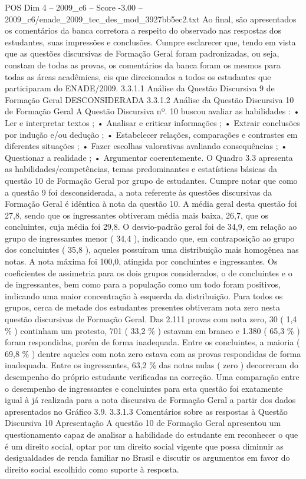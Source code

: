 \begin{textsample}{POS Dim 4 – 2009\_c6 – Score -3.00 – 2009\_c6/enade\_2009\_tec\_des\_mod\_3927bb5ec2.txt}
Ao final, são apresentados os comentários da banca corretora a respeito do observado nas respostas dos estudantes, suas impressões e conclusões.
Cumpre esclarecer que, tendo em vista que as questões discursivas de Formação Geral foram padronizadas, ou seja, constam de todas as provas, os comentários da banca foram os mesmos para todas as áreas acadêmicas, eis que direcionados a todos os estudantes que participaram do ENADE/2009. 3.3.1.1 Análise da Questão Discursiva 9 de Formação Geral DESCONSIDERADA 3.3.1.2 Análise da Questão Discursiva 10 de Formação Geral A Questão Discursiva nº. 10 buscou avaliar as habilidades : • Ler e interpretar textos ; • Analisar e criticar informações ; • Extrair conclusões por indução e/ou dedução ; • Estabelecer relações, comparações e contrastes em diferentes situações ; • Fazer escolhas valorativas avaliando consequências ; • Questionar a realidade ; • Argumentar coerentemente.
O Quadro 3.3 apresenta as habilidades/competências, temas predominantes e estatísticas básicas da questão 10 de Formação Geral por grupo de estudantes.
Cumpre notar que como a questão 9 foi desconsiderada, a nota referente às questões discursivas da Formação Geral é idêntica à nota da questão 10.
A média geral desta questão foi 27,8, sendo que os ingressantes obtiveram média mais baixa, 26,7, que os concluintes, cuja média foi 29,8.
O desvio-padrão geral foi de 34,9, em relação ao grupo de ingressantes menor ( 34,4 ), indicando que, em contraposição ao grupo dos concluintes ( 35,8 ), aqueles possuíram uma distribuição mais homogênea nas notas.
A nota máxima foi 100,0, atingida por concluintes e ingressantes.
Os coeficientes de assimetria para os dois grupos considerados, o de concluintes e o de ingressantes, bem como para a população como um todo foram positivos, indicando uma maior concentração à esquerda da distribuição.
Para todos os grupos, cerca de metade dos estudantes presentes obtiveram nota zero nesta questão discursivas de Formação Geral.
Das 2.111 provas com nota zero, 30 ( 1,4 \% ) continham um protesto, 701 ( 33,2 \% ) estavam em branco e 1.380 ( 65,3 \% ) foram respondidas, porém de forma inadequada.
Entre os concluintes, a maioria ( 69,8 \% ) dentre aqueles com nota zero estava com as provas respondidas de forma inadequada.
Entre os ingressantes, 63,2 \% das notas nulas ( zero ) decorreram do desempenho do próprio estudante verificadas na correção.
Uma comparação entre o desempenho de ingressantes e concluintes para esta questão foi exatamente igual à já realizada para a nota discursiva de Formação Geral a partir dos dados apresentados no Gráfico 3.9. 3.3.1.3 Comentários sobre as respostas à Questão Discursiva 10 Apresentação A questão 10 de Formação Geral apresentou um questionamento capaz de analisar a habilidade do estudante em reconhecer o que é um direito social, optar por um direito social vigente que possa diminuir as desigualdades de renda familiar no Brasil e discutir os argumentos em favor do direito social escolhido como suporte à resposta.

\end{textsample}
